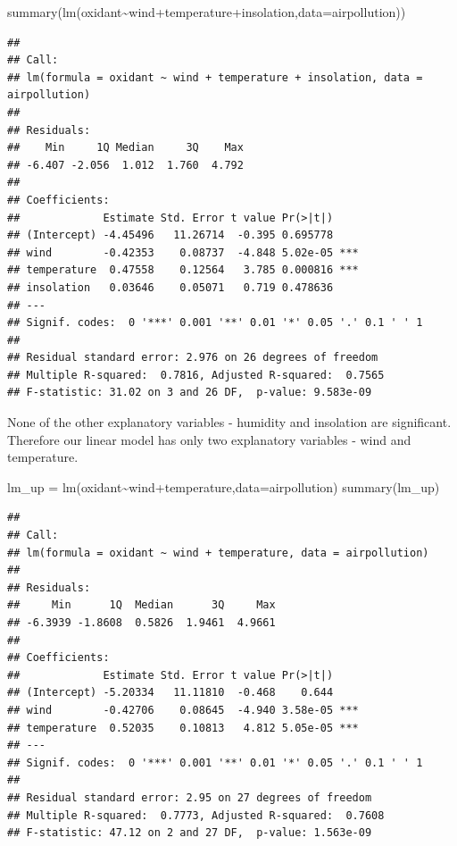 \documentclass[
]{article}
\newenvironment{Shaded}{\begin{snugshade}}{\end{snugshade}}
\newcommand{\AttributeTok}[1]{\textcolor[rgb]{0.77,0.63,0.00}{#1}}
\newcommand{\FunctionTok}[1]{\textcolor[rgb]{0.00,0.00,0.00}{#1}}
\newcommand{\NormalTok}[1]{#1}
\newcommand{\OtherTok}[1]{\textcolor[rgb]{0.56,0.35,0.01}{#1}}
\newcommand{\SpecialCharTok}[1]{\textcolor[rgb]{0.00,0.00,0.00}{#1}}
\begin{document}
\begin{Shaded}
\begin{Highlighting}[]
\FunctionTok{summary}\NormalTok{(}\FunctionTok{lm}\NormalTok{(oxidant}\SpecialCharTok{\textasciitilde{}}\NormalTok{wind}\SpecialCharTok{+}\NormalTok{temperature}\SpecialCharTok{+}\NormalTok{insolation,}\AttributeTok{data=}\NormalTok{airpollution))}
\end{Highlighting}
\end{Shaded}

\begin{verbatim}
## 
## Call:
## lm(formula = oxidant ~ wind + temperature + insolation, data = airpollution)
## 
## Residuals:
##    Min     1Q Median     3Q    Max 
## -6.407 -2.056  1.012  1.760  4.792 
## 
## Coefficients:
##             Estimate Std. Error t value Pr(>|t|)    
## (Intercept) -4.45496   11.26714  -0.395 0.695778    
## wind        -0.42353    0.08737  -4.848 5.02e-05 ***
## temperature  0.47558    0.12564   3.785 0.000816 ***
## insolation   0.03646    0.05071   0.719 0.478636    
## ---
## Signif. codes:  0 '***' 0.001 '**' 0.01 '*' 0.05 '.' 0.1 ' ' 1
## 
## Residual standard error: 2.976 on 26 degrees of freedom
## Multiple R-squared:  0.7816, Adjusted R-squared:  0.7565 
## F-statistic: 31.02 on 3 and 26 DF,  p-value: 9.583e-09
\end{verbatim}

None of the other explanatory variables - humidity and insolation are
significant. Therefore our linear model has only two explanatory
variables - wind and temperature.

\begin{Shaded}
\begin{Highlighting}[]
\NormalTok{lm\_up }\OtherTok{=} \FunctionTok{lm}\NormalTok{(oxidant}\SpecialCharTok{\textasciitilde{}}\NormalTok{wind}\SpecialCharTok{+}\NormalTok{temperature,}\AttributeTok{data=}\NormalTok{airpollution)}
\FunctionTok{summary}\NormalTok{(lm\_up)}
\end{Highlighting}
\end{Shaded}

\begin{verbatim}
## 
## Call:
## lm(formula = oxidant ~ wind + temperature, data = airpollution)
## 
## Residuals:
##     Min      1Q  Median      3Q     Max 
## -6.3939 -1.8608  0.5826  1.9461  4.9661 
## 
## Coefficients:
##             Estimate Std. Error t value Pr(>|t|)    
## (Intercept) -5.20334   11.11810  -0.468    0.644    
## wind        -0.42706    0.08645  -4.940 3.58e-05 ***
## temperature  0.52035    0.10813   4.812 5.05e-05 ***
## ---
## Signif. codes:  0 '***' 0.001 '**' 0.01 '*' 0.05 '.' 0.1 ' ' 1
## 
## Residual standard error: 2.95 on 27 degrees of freedom
## Multiple R-squared:  0.7773, Adjusted R-squared:  0.7608 
## F-statistic: 47.12 on 2 and 27 DF,  p-value: 1.563e-09
\end{verbatim}
\end{document}
